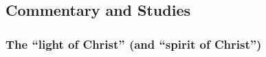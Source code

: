 

	
	
	
	
\subsection{Commentary and Studies} %
	\label{LIGHT-COMMENTARY}

	
		
	\subsubsection{The ``light of Christ'' (and ``spirit of Christ'')}
		\label{LIGHT-christ}
		
